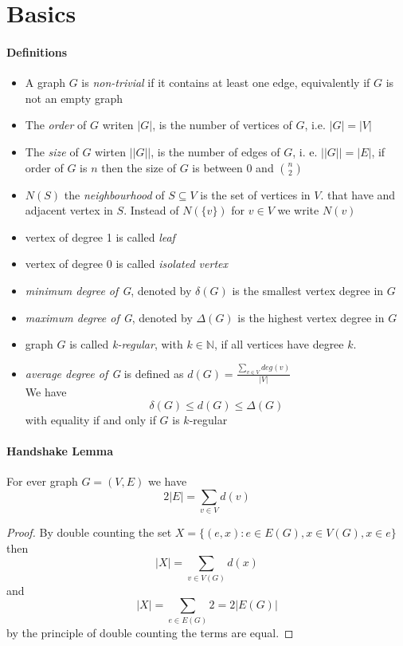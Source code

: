 \section{Basics}

\paragraph{Definitions}
\begin{itemize}
    \item A graph $ G $ is \textit{non-trivial} if it contains at least one edge,
    equivalently if $ G $ is not an empty graph 
    \item The \textit{order} of $ G $ writen $ |G| $, is the number of vertices of 
    $ G $, i.e. $ |G| = |V| $
    \item The \textit{size} of $ G $ wirten $ ||G|| $, is the number of edges of 
    $ G $, i. e. $ ||G|| = |E| $, if order of $ G $ is $ n $ then the size of $ G $ 
    is between 0 and $ \binom{n}{2} $
    \item $ N(S) $ the \textit{neighbourhood} of $ S \subseteq V $ is the set of
    vertices in $ V $. that have and adjacent vertex in $ S $. 
    Instead of $ N(\{v\}) $ for $ v \in V $ we write $ N(v) $
    \item vertex of degree 1 is called \textit{leaf}
    \item vertex of degree 0 is called \textit{isolated vertex}
    \item \textit{minimum degree of G}, denoted by $ \delta(G) $ is the smallest
    vertex degree in $ G $
    \item \textit{maximum degree of G}, denoted by $ \Delta(G) $ is the highest
    vertex degree in $ G $
    \item graph $ G $ is called \textit{k-regular}, with $ k \in \mathbb{N} $, 
    if all vertices have degree $ k $.
    \item \textit{average degree of G} is defined as $ d(G) = 
    \frac{\sum_{v \in V} deg(v)}{|V|} $ \\ We have 
    $$ \delta(G) \leq d(G) \leq \Delta(G) $$  
    with equality if and only if $ G $ is $ k$-regular

\end{itemize}

\paragraph{Handshake Lemma}
For ever graph $ G = (V,E) $ we have
$$ 2|E| = \sum_{v\in V} d(v) $$ 
\begin{proof}
   By double counting the set $ X = \{(e,x) : e \in E(G), x \in V(G), x \in e\}  $ then
   $$ |X| = \sum_{v\in V(G)} d(x) $$ 
   and 
   $$ |X| = \sum_{e\in E(G)} 2 = 2|E(G)|$$
   by the principle of double counting the terms are equal.
\end{proof}

